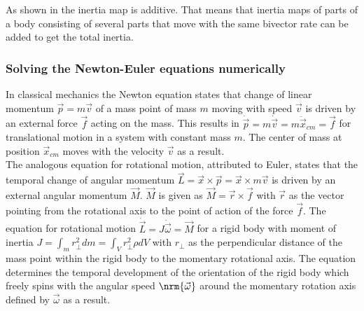 As shown in \cite{Dynamics_in_PGA_plane-based_Dorst-DeKennik:2023} the inertia map is
additive. That means that inertia maps of parts of a body consisting of several parts that
move with the same bivector rate can be added to get the total inertia. \\


\newpage

\subsubsection{Solving the Newton-Euler equations numerically}
\label{subsubsection:solving_newton-euler_numerically}

In classical mechanics the Newton equation states that change of linear momentum $\vec{p}
= m \vec{v}$ of a mass point of mass $m$ moving with speed $\vec{v}$ is driven by an
external force $\vec{f}$ acting on the mass. This results in $\dot{\vec{p}} = m
\dot{\vec{v}} = m \ddot{\vec{x}}_{cm} = \vec{f}$ for translational motion in a system with
constant mass $m$. The center of mass at position $\vec{x}_{cm}$ moves with the velocity
$\vec{v}$ as a result. \\

The analogous equation for rotational motion, attributed to Euler, states that the
temporal change of angular momentum $\vec{L} = \vec{x} \times \vec{p} = \vec{x} \times m
\vec{v}$ is driven by an external angular momentum $\vec{M}$. $\vec{M}$ is given as
$\vec{M} = \vec{r} \times \vec{f}$ with $\vec{r}$ as the vector pointing from the
rotational axis to the point of action of the force $\vec{f}$. The equation for rotational
motion $\dot{\vec{L}} = J \dot{\vec{\omega}} = \vec{M}$ for a rigid body with moment of
inertia $J = \int_{m}{r^2_\perp dm} = \int_{V}{r^2_\perp \rho dV}$ with $r_\perp$ as the
perpendicular distance of the mass point within the rigid body to the momentary rotational
axis. The equation determines the temporal development of the orientation of the rigid
body which freely spins with the angular speed $\nrm{\vec{\omega}}$ around the momentary
rotation axis defined by $\vec{\omega}$  as a result. \\

